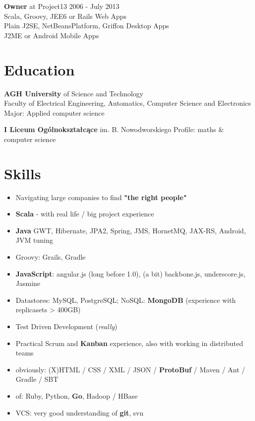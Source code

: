 \documentclass{res}
\begin{document}
\begin{resume}
{\bf Owner} at Project13                              \hfill 2006 - July 2013\\
	Scala, Groovy, JEE6 or Rails Web Apps \\
	Plain J2SE, NetBeansPlatform, Griffon Desktop Apps \\
	J2ME or Android Mobile Apps 

\section{Education} 
{\bf AGH University} of Science and Technology\\ 
	Faculty of Electrical Engineering, Automatics, Computer Science and Electronics\\
	Major: Applied computer science

{\bf I Liceum Ogólnokształcące} im. B. Nowodworskiego 
	Profile: maths \& computer science

\section{Skills}
\begin{itemize}
 \item Navigating large companies to find \textbf{"the right people"}
 \item \textbf{Scala} - with real life / big project experience
 \item \textbf{Java} GWT, Hibernate, JPA2, Spring, JMS, HornetMQ, JAX-RS, Android, JVM tuning
 \item Groovy: Grails, Gradle
 \item \textbf{JavaScript}: angular.js (long before 1.0), (a bit) backbone.js, underscore.js, Jasmine
 \item Datastores: MySQL, PostgreSQL; NoSQL: \textbf{MongoDB} (experience with replicasets > 400GB)
 \item Test Driven Development (\textit{really})
 \item Practical Scrum and \textbf{Kanban} experience, also with working in distributed teams
 \item obviously: (X)HTML / CSS / XML / JSON / \textbf{ProtoBuf} / Maven / Ant / Gradle / SBT
 \item of: Ruby, Python, \textbf{Go}, Hadoop / HBase
 \item VCS: very good understanding of \textbf{git}, svn
\end{itemize}


\end{resume}
\end{document}
